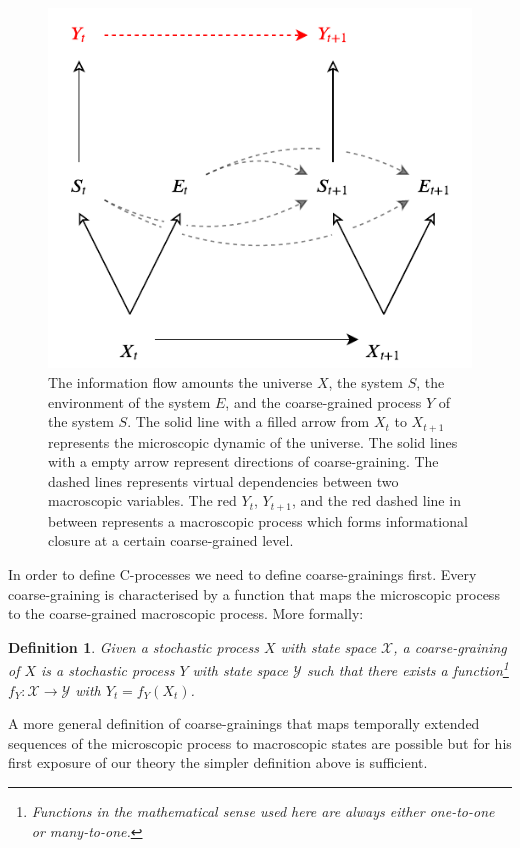 \documentclass[utf8]{article}
\newtheorem{definition}{Definition}
\begin{document}
        
		\begin{figure}[H]
		    \centering
			\includegraphics[width=\textwidth]{WritingMaterials/Fig_FullGraph/FullGraph.pdf}
			\caption{The information flow amounts the universe $X$, the system $S$, the environment of the system $E$, and the coarse-grained process $Y$ of the system $S$. The solid line with a filled arrow from $X_t$ to $X_{t+1}$ represents the microscopic dynamic of the universe. The solid lines with a empty arrow represent directions of coarse-graining. The dashed lines represents virtual dependencies between  two macroscopic variables. The red $Y_t$, $Y_{t+1}$, and the red dashed line in between represents a macroscopic process which forms informational closure at a certain coarse-grained level.}
			\label{fig:fullgraph}
	   	\end{figure}

	   	In order to define C-processes we need to define coarse-grainings first. Every coarse-graining is characterised by a function that maps the microscopic process to the coarse-grained macroscopic process. More formally: 
	   	
	   	\begin{definition}
	   	Given a stochastic process $X$ with state space $\mathcal{X}$, a \emph{coarse-graining of $X$} is a stochastic process $Y$ with state space $\mathcal{Y}$ such that there exists a function\footnote{Functions in the mathematical sense used here are always either one-to-one or many-to-one.} $f_Y:\mathcal{X}\rightarrow \mathcal{Y}$ with $Y_t=f_Y(X_t)$.  
	   	\end{definition}
	   	A more general definition of coarse-grainings that maps temporally extended sequences of the microscopic process to macroscopic states are possible but for his first exposure of our theory the simpler definition above is sufficient. 
	   	
\end{document}
